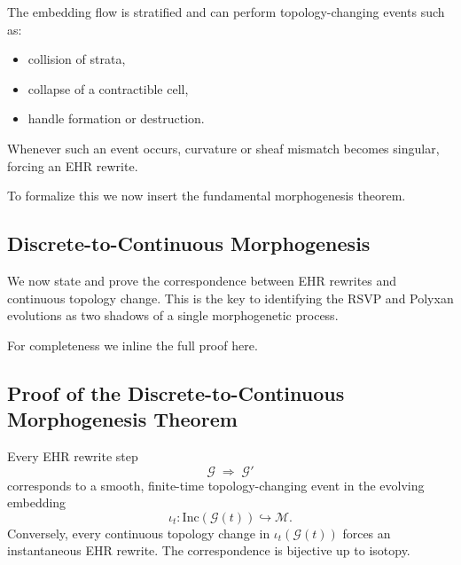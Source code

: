 The embedding flow is stratified and can perform topology-changing events such as:

\begin{itemize}
\item collision of strata,
\item collapse of a contractible cell,
\item handle formation or destruction.
\end{itemize}

Whenever such an event occurs, curvature or sheaf mismatch becomes singular, forcing an EHR rewrite.

To formalize this we now insert the fundamental morphogenesis theorem.

\subsection{Discrete-to-Continuous Morphogenesis}
\label{subsec:morphogenesis}

We now state and prove the correspondence between EHR rewrites and continuous
topology change.  
This is the key to identifying the RSVP and Polyxan evolutions as two shadows of
a single morphogenetic process.


For completeness we inline the full proof here.

\subsection{Proof of the Discrete-to-Continuous Morphogenesis Theorem}
\label{subsec:morphogenesis-proof}

\begin{theorem}
\label{thm:morphogenesis}
Every EHR rewrite step
\[
\mathcal{G} \;\Rightarrow\; \mathcal{G}'
\]
corresponds to a smooth, finite-time topology-changing event in the evolving
embedding
\[
\iota_t : \mathrm{Inc}(\mathcal{G}(t)) \hookrightarrow \mathcal{M}.
\]
Conversely, every continuous topology change in $\iota_t(\mathcal{G}(t))$
forces an instantaneous EHR rewrite.  
The correspondence is bijective up to isotopy.
\end{theorem}

